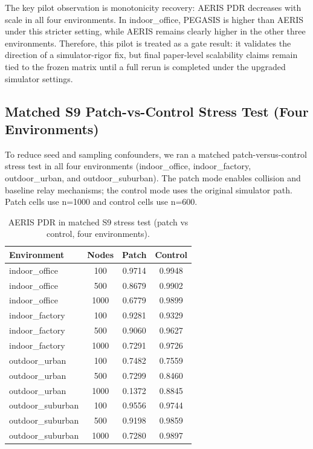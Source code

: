 ﻿\documentclass[sensors,article,submit,moreauthors,pdftex]{Definitions/mdpi}
\begin{document}
The key pilot observation is monotonicity recovery: AERIS PDR decreases with scale in all four environments. In indoor\_office, PEGASIS is higher than AERIS under this stricter setting, while AERIS remains clearly higher in the other three environments. Therefore, this pilot is treated as a gate result: it validates the direction of a simulator-rigor fix, but final paper-level scalability claims remain tied to the frozen matrix until a full rerun is completed under the upgraded simulator settings.

\subsection{Matched S9 Patch-vs-Control Stress Test (Four Environments)}
To reduce seed and sampling confounders, we ran a matched patch-versus-control stress test in all four environments (indoor\_office, indoor\_factory, outdoor\_urban, and outdoor\_suburban). The patch mode enables collision and baseline relay mechanisms; the control mode uses the original simulator path. Patch cells use n=1000 and control cells use n=600.

\begin{table}[H]
\caption{AERIS PDR in matched S9 stress test (patch vs control, four environments).}
\label{tab:s9_patch_control}
\centering
\begin{tabular}{lccc}
\toprule
Environment & Nodes & Patch & Control \\
\midrule
indoor\_office & 100  & 0.9714 & 0.9948 \\
indoor\_office & 500  & 0.8679 & 0.9902 \\
indoor\_office & 1000 & 0.6779 & 0.9899 \\
indoor\_factory & 100  & 0.9281 & 0.9329 \\
indoor\_factory & 500  & 0.9060 & 0.9627 \\
indoor\_factory & 1000 & 0.7291 & 0.9726 \\
outdoor\_urban & 100  & 0.7482 & 0.7559 \\
outdoor\_urban & 500  & 0.7299 & 0.8460 \\
outdoor\_urban & 1000 & 0.1372 & 0.8845 \\
outdoor\_suburban & 100  & 0.9556 & 0.9744 \\
outdoor\_suburban & 500  & 0.9198 & 0.9859 \\
outdoor\_suburban & 1000 & 0.7280 & 0.9897 \\
\bottomrule
\end{tabular}
\end{table}
\end{document}
